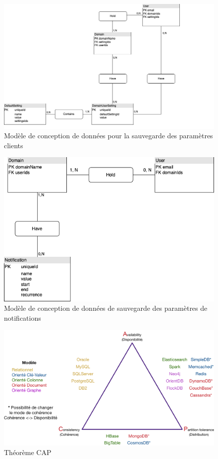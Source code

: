 \documentclass[a4paper, 11pt]{report}
\begin{document}
  \begin{figure}[h]
      \centering
      \includegraphics[scale=0.40,center]{schemas/settings-mcd-kingcandy.png}
      \caption{Modèle de conception de données pour la sauvegarde des paramètres clients}
  \end{figure}
  \begin{figure}[h]
      \centering
      \includegraphics[scale=0.40,center]{schemas/notifications-mcd-calhoun.png}
      \caption{Modèle de conception de données de sauvegarde des paramètres de notifications}
  \end{figure}
  \begin{figure}[h]
      \centering
      \includegraphics[scale=0.25,center]{schemas/cap-theoreme.png}
      \caption{Théorème CAP}
  \end{figure}
\end{document}
